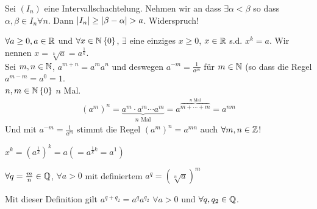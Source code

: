 \begin{Bew}
  Sei $(I_n)$ eine Intervallschachtelung. Nehmen wir an dass $\exists \alpha < \beta$ so dass $\alpha, \beta\in I_n\forall n$. Dann $\abs{I_n}\geq\abs{\beta-\alpha}> a$. Widerspruch!
\end{Bew}
\begin{Sat}
  $\forall a\geq 0, a\in\mathbb{R}$ und $\forall x\in\mathbb{N}\\\left\{ 0 \right\}$, $\exists$ eine einziges $x\geq 0$, $x\in \mathbb{R}$ s.d. $x^k=a$. Wir nennen $x=\sqrt[k]{a}=a^\frac{1}{k}$.\\
  Sei $m,n\in\mathbb{N}$, $a^{m+n}=a^ma^n$ und deswegen $a^{-m}=\frac{1}{a^m}$ für $m\in\mathbb{N}$ (so dass die Regel $a^{m-m}=a^0=1$.\\
  $n,m\in\mathbb{N}\\\left\{ 0 \right\}$ $n$ Mal.
  \begin{align*}
    (a^m)^n=\underbrace{a^m\cdot a^m \cdots a^m}_{\text{$n$ Mal}} = a^{\overbrace{m+\cdots+m}^{\text{$n$ Mal}}} = a^{nm}
  \end{align*}
  Und mit $a^{-m}=\frac{1}{a^m}$ stimmt die Regel $(a^m)^n=a^{mn}$ auch $\forall m,n\in\mathbb{Z}$!
\end{Sat}
\begin{Bem}
    $x^k=\left( a^\frac{1}{k} \right)^k=a\left( =a^{\frac{1}{k}k} = a^1\right)$
\end{Bem}
\begin{Def}
  $\forall q=\frac{m}{n}\in\mathbb{Q}$, $\forall a>0$ mit definiertem $a^q=\left(\sqrt[n]{a}\right)^m$
\end{Def}
\begin{Bew}
  Mit dieser Definition gilt $a^{q+q_2} = a^qa^{q_2}$ $\forall a>0$ und $\forall q,q_2\in\mathbb{Q}$.
\end{Bew}
